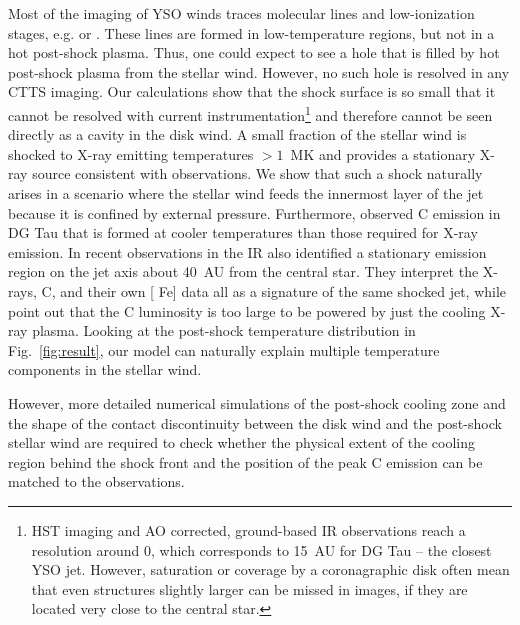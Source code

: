 \documentclass{emulateapj}
\begin{document}
Most of the imaging of YSO winds traces molecular lines and low-ionization stages, e.g.  or . These lines are formed in low-temperature regions, but not in a hot post-shock plasma. Thus, one could expect to see a hole that is filled by hot post-shock plasma from the stellar wind. However, no such hole is resolved in any CTTS imaging. Our calculations show that the shock surface is so small that it cannot be resolved with current instrumentation\footnote{HST imaging and AO corrected, ground-based IR observations reach a resolution around 0, which corresponds to 15~AU for DG Tau -- the closest YSO jet. However, saturation or coverage by a coronagraphic disk often mean that even structures slightly larger can be missed in images, if they are located very close to the central star.} and therefore cannot be seen directly as a cavity in the disk wind. A small fraction of the stellar wind is shocked to X-ray emitting temperatures $>1$~MK and provides a stationary X-ray source consistent with observations. 
We show that such a shock naturally arises in a scenario where the stellar wind feeds the innermost layer of the jet because it is confined by external pressure.
Furthermore, \citet{2013A&A...550L...1S} observed C emission in DG Tau that is formed at cooler temperatures than those required for X-ray emission. In recent observations in the IR \citet{2014arXiv1404.0728W} also identified a stationary emission region on the jet axis about 40~AU from the central star. They interpret the X-rays,  C, and their own [ Fe] data all as a signature of the same shocked jet, while \citet{2013A&A...550L...1S} point out that the C luminosity is too large to be powered by just the cooling X-ray plasma. Looking at the post-shock temperature distribution in Fig.~\ref{fig:result}, our model can naturally explain multiple temperature components in the stellar wind.

However, more detailed numerical simulations of the post-shock cooling zone and the shape of the contact discontinuity between the disk wind and the post-shock stellar wind are required to check whether the physical extent of the cooling region behind the shock front and the position of the peak  C emission can be matched to the observations.
\end{document}
